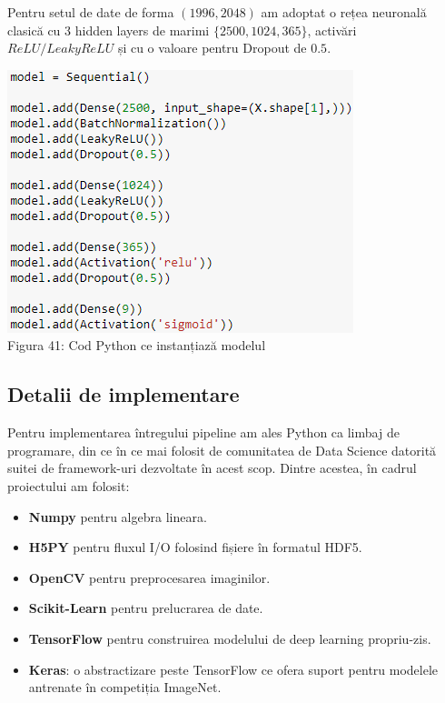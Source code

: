 \pagebreak

Pentru setul de date de forma $(1996,2048)$ am adoptat o rețea neuronală clasică cu 3 hidden layers de marimi $\{2500,1024,365\}$, activări $ReLU/LeakyReLU$ și cu o valoare pentru Dropout de $0.5$.

\begin{center}
\includegraphics[scale=1]{networkArhitecture} \\
Figura 41: Cod Python ce instanțiază modelul
\end{center}

\subsection{Detalii de implementare}
Pentru implementarea întregului pipeline am ales Python ca limbaj de programare, din ce în ce mai folosit de comunitatea de Data Science datorită suitei de framework-uri dezvoltate în acest scop. Dintre acestea, în cadrul proiectului am folosit:

\begin{itemize}
\item \textbf{Numpy} pentru algebra lineara.
\item \textbf{H5PY} pentru fluxul I/O folosind fișiere în formatul HDF5.
\item \textbf{OpenCV} pentru preprocesarea imaginilor.
\item \textbf{Scikit-Learn} pentru prelucrarea de date.
\item \textbf{TensorFlow} pentru construirea modelului de deep learning propriu-zis.
\item \textbf{Keras}: o abstractizare peste TensorFlow ce ofera suport pentru modelele antrenate în competiția ImageNet.
\end{itemize}

